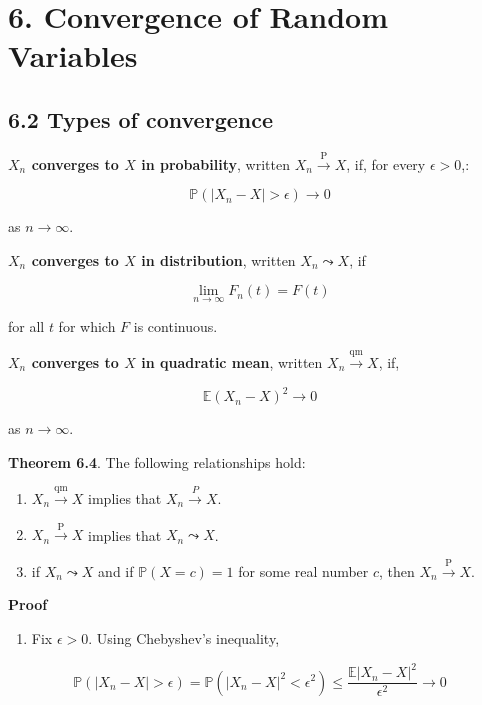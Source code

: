 \section*{6. Convergence of Random Variables}\label{convergence-of-random-variables}

\subsection*{6.2 Types of convergence}\label{types-of-convergence}

\textbf{\(X_{n}\) converges to \(X\) in probability}, written
\(X_{n} \xrightarrow{\text{P}} X\), if, for every \(\epsilon > 0\),:

\[ \mathbb{P}( |X_{n} - X| > \epsilon ) \rightarrow 0 \]

as \(n \rightarrow \infty\).

\textbf{\(X_{n}\) converges to \(X\) in distribution}, written
\(X_{n} \leadsto X\), if

\[ \lim _{n \rightarrow \infty} F_{n}(t) = F(t) \]

for all \(t\) for which \(F\) is continuous.

\textbf{\(X_{n}\) converges to \(X\) in quadratic mean}, written
\(X_{n} \xrightarrow{\text{qm}} X\), if,

\[ \mathbb{E}(X_{n} - X)^{2} \rightarrow 0 \]

as \(n \rightarrow \infty\).

\textbf{Theorem 6.4}. The following relationships hold:

\begin{enumerate}[label={\arabic*.}]
\item
  \(X_{n} \xrightarrow{\text{qm}} X\) implies that
  \(X_{n} \xrightarrow{P} X\).
\item
  \(X_{n} \xrightarrow{\text{P}} X\) implies that \(X_{n} \leadsto X\).
\item
  if \(X_{n} \leadsto X\) and if \(\mathbb{P}(X = c) = 1\) for some real
  number \(c\), then \(X_{n} \xrightarrow{\text{P}} X\).
\end{enumerate}

\textbf{Proof}

\begin{enumerate}[tightlist,label={\arabic*.}]
\item
  Fix \(\epsilon > 0\). Using Chebyshev's inequality,
\end{enumerate}

\[ \mathbb{P}(|X_{n} - X| > \epsilon) = \mathbb{P}(|X_{n} - X|^{2} < \epsilon^{2}) \leq \frac{\mathbb{E}|X_{n} - X|^{2}}{\epsilon^{2}} \rightarrow 0 \]

